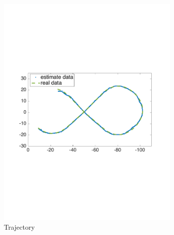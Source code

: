 \begin{figure}[!htbp]
  \centering
  \begin{subfigure}[b]{0.6\textwidth}
        \includegraphics[width=\textwidth]{img/high_altitude_error_xy.pdf}
        \caption{Trajectory}
        \label{fig:one}
   \end{subfigure} \\
   \begin{subfigure}[b]{0.4\textwidth}

\end{subfigure}
\end{figure}
